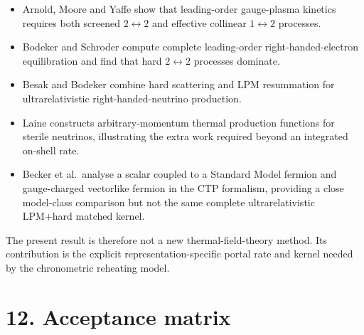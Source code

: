 \documentclass[
  10pt,
]{article}
\providecommand{\tightlist}{%
  \setlength{\itemsep}{0pt}\setlength{\parskip}{0pt}}
\begin{document}
\begin{itemize}
\tightlist
\item
  Arnold, Moore and Yaffe show that leading-order gauge-plasma kinetics
  requires both screened \(2\leftrightarrow2\) and effective collinear
  \(1\leftrightarrow2\) processes.
\item
  Bodeker and Schroder compute complete leading-order
  right-handed-electron equilibration and find that hard
  \(2\leftrightarrow2\) processes dominate.
\item
  Besak and Bodeker combine hard scattering and LPM resummation for
  ultrarelativistic right-handed-neutrino production.
\item
  Laine constructs arbitrary-momentum thermal production functions for
  sterile neutrinos, illustrating the extra work required beyond an
  integrated on-shell rate.
\item
  Becker et al.~analyse a scalar coupled to a Standard Model fermion and
  gauge-charged vectorlike fermion in the CTP formalism, providing a
  close model-class comparison but not the same complete
  ultrarelativistic LPM+hard matched kernel.
\end{itemize}

The present result is therefore not a new thermal-field-theory method.
Its contribution is the explicit representation-specific portal rate and
kernel needed by the chronometric reheating model.

\section{12. Acceptance matrix}\label{acceptance-matrix}
\end{document}
